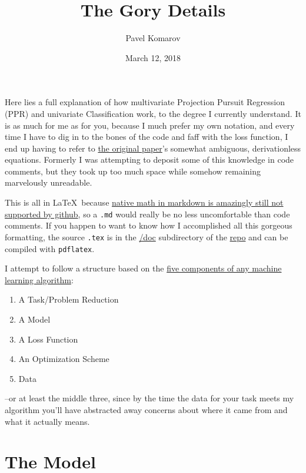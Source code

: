 \documentclass[12pt]{article}
\begin{document}
\title{The Gory Details}
\author{Pavel Komarov}
\date{March 12, 2018}
\maketitle

Here lies a full explanation of how multivariate Projection Pursuit Regression (PPR) and univariate Classification work, to the degree I currently understand. It is as much for me as for you, because I much prefer my own notation, and every time I have to dig in to the bones of the code and faff with the loss function, I end up having to refer to \href{http://www.slac.stanford.edu/cgi-wrap/getdoc/slac-pub-3824.pdf}{the original paper}'s somewhat ambiguous, derivationless equations. Formerly I was attempting to deposit some of this knowledge in code comments, but they took up too much space while somehow remaining marvelously unreadable.

This is all in \LaTeX\ because \href{https://github.com/github/markup/issues/897}{native math in markdown is amazingly still not supported by github}, so a \texttt{.md} would really be no less uncomfortable than code comments. If you happen to want to know how I accomplished all this gorgeous formatting, the source \texttt{.tex} is in the \href{https://github.com/pavelkomarov/projection-pursuit/tree/master/doc}{/doc} subdirectory of the \href{https://github.com/pavelkomarov/projection-pursuit}{repo} and can be compiled with \texttt{pdflatex}.

I attempt to follow a structure based on the \href{http://lmgtfy.com/?q=sorry+this+link+doesn\%27t+work+yet+I+still+have+to+post+those+slides}{five components of any machine learning algorithm}:

\begin{enumerate}
	\setlength\itemsep{-2mm}
	\item A Task/Problem Reduction
	\item A Model
	\item A Loss Function
	\item An Optimization Scheme
	\item Data
\end{enumerate}

--or at least the middle three, since by the time the data for your task meets my algorithm you'll have abstracted away concerns about where it came from and what it actually means.

\section{The Model}
\end{document}
